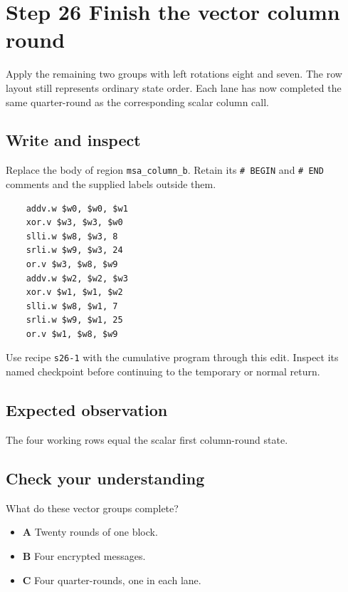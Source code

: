 \section{Step 26 Finish the vector column round}\label{chacha-s26}

Apply the remaining two groups with left rotations eight and seven. The row layout still represents ordinary state order. Each lane has now completed the same quarter-round as the corresponding scalar column call.

\subsection{Write and inspect}
Replace the body of region \texttt{msa\_column\_b}. Retain its \texttt{\# BEGIN} and \texttt{\# END} comments and the supplied labels outside them.

\begin{verbatim}
    addv.w $w0, $w0, $w1
    xor.v $w3, $w3, $w0
    slli.w $w8, $w3, 8
    srli.w $w9, $w3, 24
    or.v $w3, $w8, $w9
    addv.w $w2, $w2, $w3
    xor.v $w1, $w1, $w2
    slli.w $w8, $w1, 7
    srli.w $w9, $w1, 25
    or.v $w1, $w8, $w9
\end{verbatim}

Use recipe \texttt{s26-1} with the cumulative program through this edit. Inspect its named checkpoint before continuing to the temporary or normal return.

\subsection{Expected observation}
The four working rows equal the scalar first column-round state.

\subsection{Check your understanding}
What do these vector groups complete?

\begin{itemize}
  \item \textbf{A} Twenty rounds of one block.
  \item \textbf{B} Four encrypted messages.
  \item \textbf{C} Four quarter-rounds, one in each lane.
\end{itemize}
